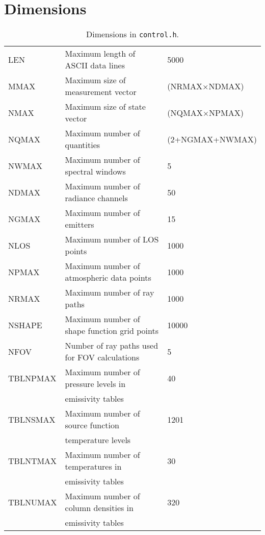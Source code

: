 \section{Dimensions}
\begin{table*}[!h]
\caption{Dimensions in \texttt{control.h}.}
\begin{tabular}{|l|l|l|}
\hline
\cellcolor[RGB]{188,188,188}{name} & \cellcolor[RGB]{188,188,188}{purpose} & 
\cellcolor[RGB]{188,188,188}{value}  \\
\hline
\hline
LEN      & Maximum length of ASCII data lines            & 5000 \\
MMAX     & Maximum size of measurement vector            & (NRMAX$\times$NDMAX) \\
NMAX     & Maximum size of state vector                  & (NQMAX$\times$NPMAX) \\
NQMAX    & Maximum number of quantities                  & (2+NGMAX+NWMAX) \\
NWMAX    & Maximum number of spectral windows            & 5 \\
NDMAX    & Maximum number of radiance channels           & 50 \\
NGMAX    & Maximum number of emitters                    & 15 \\
NLOS     & Maximum number of LOS points                  & 1000 \\
NPMAX    & Maximum number of atmospheric data points     & 1000 \\
NRMAX    & Maximum number of ray paths                   & 1000 \\
NSHAPE   & Maximum number of shape function grid points  & 10000 \\
NFOV     & Number of ray paths used for FOV calculations & 5 \\
TBLNPMAX & Maximum number of pressure levels in          & 40 \\
         & emissivity tables                             & \\
TBLNSMAX & Maximum number of source function             & 1201 \\
         & temperature levels                            & \\
TBLNTMAX & Maximum number of temperatures in             & 30 \\
         & emissivity tables                             & \\ 
TBLNUMAX & Maximum number of column densities in         & 320 \\
         & emissivity tables                             & \\ 

\end{tabular}
\end{table*}
